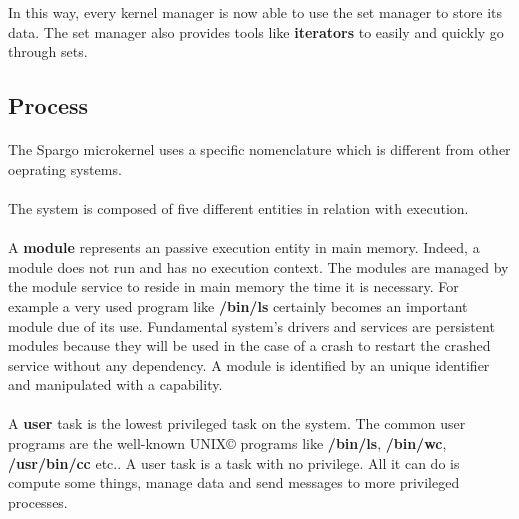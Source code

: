 \documentclass[10pt,a4wide]{article}
\begin{document}
\begin{multicols}{2}
In this way, every kernel manager is now able to use the set manager to
store its data. The set manager also provides tools like \textbf{iterators}
to easily and quickly go through sets.

\subsection{Process}

\paragraph{}

The Spargo microkernel uses a specific nomenclature which is different
from other oeprating systems.

\paragraph{}

The system is composed of five different entities in relation with execution.

\paragraph{}

A \textbf{module} represents an passive execution entity in main memory.
Indeed, a module does not run and has no execution context. The modules are
managed by the module service to reside in main memory the time it is
necessary. For example a very used program like \textbf{/bin/ls} certainly
becomes an important module due of its use. Fundamental system's drivers
and services are persistent modules because they will be used in the case
of a crash to restart the crashed service without any dependency.
A module is identified by an unique identifier and manipulated with a
capability.

\paragraph{}

A \textbf{user} task is the lowest privileged task on the system.
The common user programs are the well-known UNIX{\scriptsize \copyright}
programs like \textbf{/bin/ls}, \textbf{/bin/wc}, \textbf{/usr/bin/cc} etc..
A user task is a task with no privilege. All it can do is compute some things,
manage data and send messages to more privileged processes.

\paragraph{}


\end{multicols}
\end{document}
